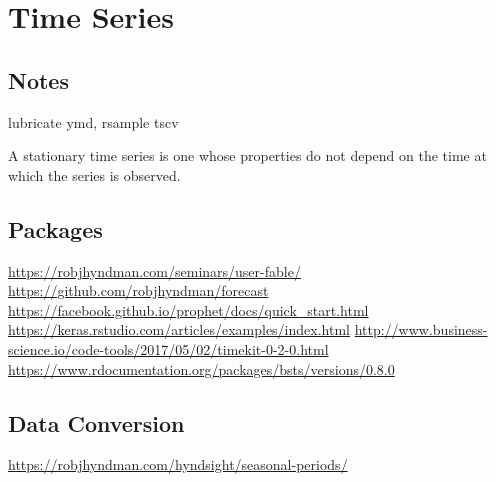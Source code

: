 \documentclass[]{book}
\newenvironment{Shaded}{\begin{snugshade}}{\end{snugshade}}
\newcommand{\KeywordTok}[1]{\textcolor[rgb]{0.13,0.29,0.53}{\textbf{#1}}}
\newcommand{\DataTypeTok}[1]{\textcolor[rgb]{0.13,0.29,0.53}{#1}}
\newcommand{\DecValTok}[1]{\textcolor[rgb]{0.00,0.00,0.81}{#1}}
\newcommand{\FloatTok}[1]{\textcolor[rgb]{0.00,0.00,0.81}{#1}}
\newcommand{\StringTok}[1]{\textcolor[rgb]{0.31,0.60,0.02}{#1}}
\newcommand{\OperatorTok}[1]{\textcolor[rgb]{0.81,0.36,0.00}{\textbf{#1}}}
\newcommand{\NormalTok}[1]{#1}
\begin{document}
\chapter{Time Series}\label{time-series}

\section{Notes}\label{notes}

lubricate ymd, rsample tscv

A stationary time series is one whose properties do not depend on the
time at which the series is observed.

\section{Packages}\label{packages}

\url{https://robjhyndman.com/seminars/user-fable/}
\url{https://github.com/robjhyndman/forecast}
\url{https://facebook.github.io/prophet/docs/quick_start.html}
\url{https://keras.rstudio.com/articles/examples/index.html}
\url{http://www.business-science.io/code-tools/2017/05/02/timekit-0-2-0.html}
\url{https://www.rdocumentation.org/packages/bsts/versions/0.8.0}

\section{Data Conversion}\label{data-conversion}

\url{https://robjhyndman.com/hyndsight/seasonal-periods/}

\begin{Shaded}
\end{Shaded}
\end{document}
